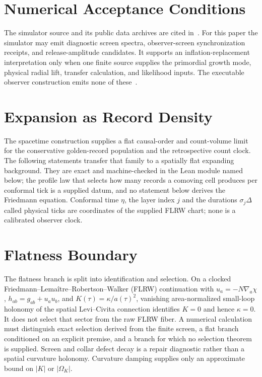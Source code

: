 \documentclass[11pt]{article}
\theoremstyle{remark}
\theoremstyle{plain}
\begin{document}
\section{Numerical Acceptance Conditions}

The simulator source and its public data archives are cited
in~\cite{ophsim}. For this paper the simulator may emit diagnostic
screen spectra, observer-screen synchronization receipts, and release-amplitude candidates.  It
supports an inflation-replacement interpretation only when one finite source supplies the
primordial growth mode, physical radial lift, transfer calculation, and likelihood inputs.
The executable observer construction emits none of these~\cite{ophmodel}.

\section{Expansion as Record Density}
\label{sec:expansion-record-density}

The spacetime construction supplies a flat causal-order and count-volume
limit for the conservative golden-record population and the retrospective
count clock. The following statements transfer that family to a spatially
flat expanding background. They are exact and machine-checked in the Lean
module named below; the profile law that selects how many records a comoving
cell produces per conformal tick is a supplied datum, and no statement below
derives the Friedmann equation. Conformal time \(\eta\), the layer index
\(j\) and the durations \(\sigma_j\Delta\) called physical ticks are
coordinates of the supplied FLRW chart; none is a calibrated observer clock.



\section{Flatness Boundary}

The flatness branch is split into identification and selection. On a clocked
Friedmann--Lema\^itre--Robertson--Walker (FLRW) continuation
with \(u_a=-N\nabla_a\chi\), \(h_{ab}=g_{ab}+u_au_b\), and
\(K(\tau)=\kappa/a(\tau)^2\), vanishing area-normalized small-loop holonomy of
the spatial Levi--Civita connection identifies \(K=0\) and hence
\(\kappa=0\). It does not select that sector
from the raw FLRW fiber. A numerical calculation must distinguish exact
selection derived from the finite screen, a flat branch conditioned on an
explicit premise, and a branch for which no selection theorem is supplied. Screen and collar defect
decay is a repair diagnostic rather than a spatial curvature holonomy.
Curvature damping supplies only an approximate bound on \(|K|\) or
\(|\Omega_K|\).
\end{document}
